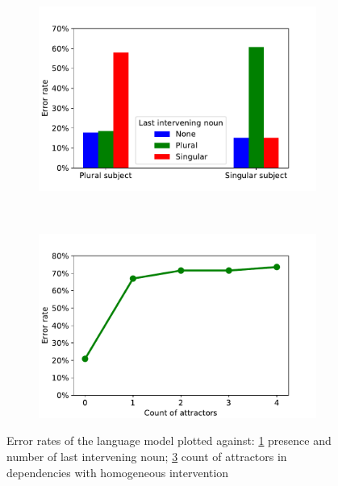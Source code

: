 \documentclass[twoside]{article}
\begin{document}
\begin{figure}
    \centering
    \begin{subfigure}[b]{0.4\textwidth}
    \caption{}
        \includegraphics[width=\textwidth]{2b.pdf}
        \label{fig:2b}
    \end{subfigure}
    ~ %
    \begin{subfigure}[b]{0.4\textwidth}
    	\caption{}
        \includegraphics[width=\textwidth]{2c.pdf}
        \label{fig:2c}
    \end{subfigure}
    \caption{Error rates of the language model plotted against: \ref{fig:2b} presence and number of last intervening noun; \ref{fig:2c} count of attractors in dependencies with homogeneous intervention}
\end{figure}
\end{document}
